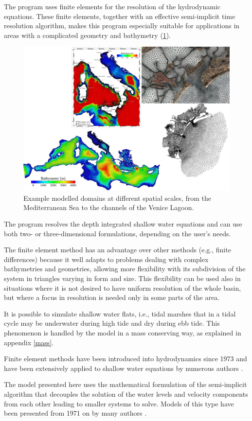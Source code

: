 The program uses finite elements for the resolution of
the hydrodynamic equations. These finite elements, together with an
effective semi-implicit time resolution algorithm, makes this program
especially suitable for applications in areas with a complicated geometry
and bathymetry (\Fig \ref{grids}).

\begin{figure}[htbp]
\centering
\includegraphics[scale=0.45]{overview_model.png}
\caption{Example modelled domains at different spatial scales, from the Mediterranean Sea to the channels of the Venice Lagoon.}
\label{grids}
\end{figure}


The program \shy{} resolves the depth integrated shallow water equations
and can use both two- or three-dimensional formulations, depending
on the user's needs.

The finite element method has
an advantage over other methods (e.g., finite differences) because it
well adapts to problems dealing with complex
bathymetries and geometries, allowing more flexibility with its subdivision of the system in triangles
varying in form and size.  This flexibility can be used also in situations
where it is not desired to have uniform resolution of the whole basin,
but where a focus in resolution is needed only in some parts of the area.

It is possible to simulate shallow water flats, i.e., tidal marshes
that in a tidal cycle may be underwater during high tide and
dry during ebb tide. This phenomenon is handled by the model
in a mass conserving way, as explained in appendix \ref{mass}.

Finite element methods have been introduced into hydrodynamics since 1973
and have been extensively applied to shallow water equations by numerous
authors \cite{Grotkop73, Taylor75, Herrling77, Herrling78, Holz82}.


The model presented here \cite{Umgies86, Umgies93} uses the mathematical
formulation of the semi-implicit algorithm that decouples the solution
of the water levels and velocity components from each other leading to
smaller systems to solve. Models of this type have been presented from
1971 on by many authors \cite{Kwizak71, Duwe82, Backhaus83}.

